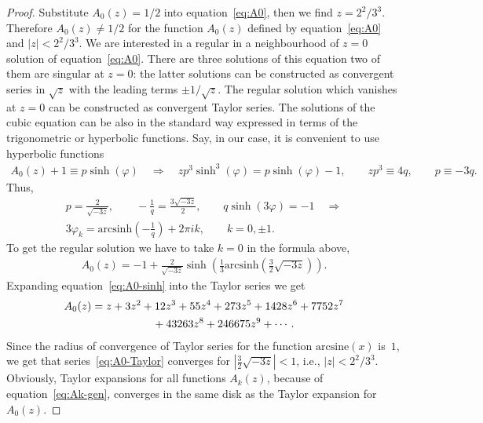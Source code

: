 \documentclass[pdftex]{sigma}
\numberwithin{equation}{section}
\begin{document}
\begin{proof}
Substitute $A_0(z)=1/2$ into equation~\eqref{eq:A0}, then we find $z=2^2/3^3$. Therefore $A_0(z)\neq1/2$ for the
function $A_0(z)$ defined by equation~\eqref{eq:A0} and $|z|< 2^2/3^3$. We are interested in a regular in
a neighbourhood of $z=0$ solution of equation~\eqref{eq:A0}. There are three solutions of this equation two of them
are singular at $z=0$: the latter solutions can be constructed as convergent series in $\sqrt{z}$ with the leading
terms $\pm1/\sqrt{z}$. The regular solution which vanishes at $z=0$ can be constructed as convergent Taylor series.
The solutions of the cubic equation can be also in the standard way expressed in terms of the trigonometric or
hyperbolic functions. Say, in our case, it is convenient to use hyperbolic functions
\begin{gather*}
A_0(z)+1\equiv p\sinh(\varphi) \quad \Rightarrow \quad
zp^3\sinh^3(\varphi)=p\sinh(\varphi)-1,\qquad zp^3\equiv 4q, \qquad
p\equiv-3q.
\end{gather*}
Thus,
\begin{gather*}
p=\frac2{\sqrt{-3z}},\qquad
-\frac1q=\frac{3\sqrt{-3z}}{2},\qquad
q\sinh(3\varphi)=-1 \quad \Rightarrow \\
3\varphi_k=\mathrm{arcsinh}\left(-\frac1q\right)+2\pi ik,\qquad k=0,\pm1.
\end{gather*}
To get the regular solution we have to take $k=0$ in the formula above,
\begin{gather}\label{eq:A0-sinh}
A_0(z)=-1+\frac2{\sqrt{-3z}}\sinh\left(\frac13 \mathrm{arcsinh}\left(\frac32\sqrt{-3z}\right)\right).
\end{gather}
Expanding equation~\eqref{eq:A0-sinh} into the Taylor series we get
\begin{gather}
A_0(z)=z+3z^2+12z^3+55z^4+273z^5+1428z^6+7752z^7\nonumber\\
\hphantom{A_0(z)=}{} +43263z^8+246675z^9+\cdots.\label{eq:A0-Taylor}
\end{gather}
Since the radius of convergence of Taylor series for the function $\mathrm{arcsine}(x)$ is~$1$,
we get that series~\eqref{eq:A0-Taylor} converges for $\left|\frac32\sqrt{-3z}\right|<1$, i.e., $|z|<2^2/3^3$.
Obviously, Taylor expansions for all functions $A_k(z)$, because of equation~\eqref{eq:Ak-gen}, converges in the
same disk as the Taylor expansion for $A_0(z)$.
\end{proof}
\end{document}
